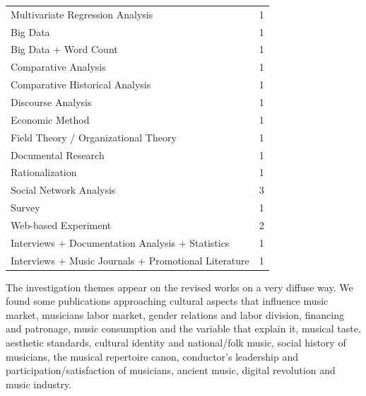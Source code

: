 \documentclass[a4paper, 12pt, openright, oneside, german, french, brazil, english, article]{abntex2}
\begin{document}
	\begin{table}[ht]
		{\begin{tabular}{lr}
				\hline
				\hline
				Multivariate Regression Analysis &   1 \\ 
				Big Data &   1 \\ 
				Big Data + Word Count &   1 \\ 
				Comparative Analysis &   1 \\ 
				Comparative Historical Analysis &   1 \\ 
				Discourse Analysis &   1 \\ 
				Economic Method &   1 \\ 
				Field Theory / Organizational Theory &   1 \\ 
				Documental Research &   1 \\ 
				Rationalization &   1 \\ 
				Social Network Analysis &   3 \\ 
				Survey &   1 \\ 
				Web-based Experiment &   2 \\ 
				Interviews + Documentation Analysis + Statistics  &  1 \\
				Interviews + Music Journals + Promotional Literature &   1 \\ 
				\hline
			\end{tabular}
		}
		{}
	\end{table}
	

	The investigation themes appear on the revised works on a very diffuse way. We found some publications approaching cultural aspects that influence music market, musicians labor market, gender relations and labor division, financing and patronage, music consumption and the variable that explain it, musical taste, aesthetic standards, cultural identity and national/folk music, social history of musicians, the musical repertoire canon,  conductor's leadership and participation/satisfaction of musicians, ancient music, digital revolution and music industry.
\end{document}
